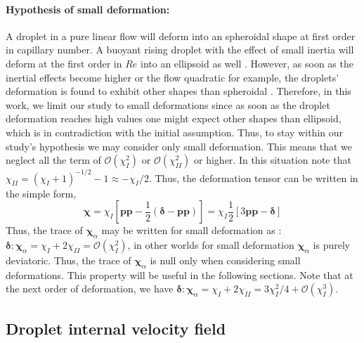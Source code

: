     
\paragraph*{Hypothesis of small deformation: }
A droplet in a pure linear flow will deform into an spheroidal shape \citet{leal2007advanced} at first order in capillary number. 
A buoyant rising droplet with the effect of small inertia will deform at the first order in $Re$ into an ellipsoid as well \citep{taylor1964deformation}.
However, as soon as the inertial effects become higher or the flow quadratic for example, the droplets' deformation is found to exhibit other shapes than spheroidal \citep{taylor1964deformation,stone1990simple}.
Therefore, in this work, we limit our study to small deformations since as soon as the droplet deformation reaches high values one might expect other shapes than ellipsoid, which is in contradiction with the initial assumption. 
Thus, to stay within our study's hypothesis we may consider only small deformation. 
This means that we neglect all the term of $\mathcal{O}(\chi_I^2)$ or $\mathcal{O}(\chi_{II}^2)$ or higher. 
In this situation note that $\chi_{II} = (\chi_I + 1)^{-1/2} -1 \approx  - \chi_I /2$. 
Thus, the deformation tensor can be written in the simple form, 
\begin{equation}
    \bm\chi 
    = \chi_I
    \left[
        \textbf{pp} 
        - \frac{1}{2}(\bm\delta - \textbf{pp})
    \right]
    = \chi_I \frac{1}{2} \left[
        3 \textbf{pp} - \bm\delta
    \right]
    \label{eq:chi_I_small_def}
\end{equation}
Thus, the trace of $\bm\chi_\alpha$ may be written for small deformation as :  $\bm\delta:\bm\chi_\alpha  = \chi_I + 2\chi_{II} = \mathcal{O}(\chi_{I}^2)$, in other worlds for small deformation $\bm\chi_\alpha$ is purely deviatoric. 
Thus, the trace of $\bm\chi_\alpha$ is null only when considering small deformations. 
This property will be useful in the following sections.
Note that at the next order of deformation, we have $\bm\delta:\bm\chi_\alpha  = \chi_I + 2\chi_{II} = 3 \chi_I^2 /4 +  \mathcal{O}(\chi_{I}^3)$. 

\subsection{Droplet internal velocity field}

